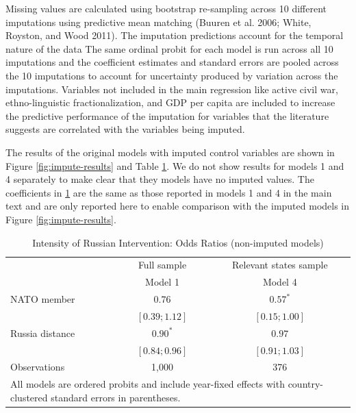 \documentclass[
]{article}
\begin{document}
Missing values are calculated using bootstrap re-sampling across 10 different imputations using predictive mean matching (Buuren et al. 2006; White, Royston, and Wood 2011). The imputation predictions account for the temporal nature of the data The same ordinal probit for each model is run across all 10 imputations and the coefficient estimates and standard errors are pooled across the 10 imputations to account for uncertainty produced by variation across the imputations. Variables not included in the main regression like active civil war, ethno-linguistic fractionalization, and GDP per capita are included to increase the predictive performance of the imputation for variables that the literature suggests are correlated with the variables being imputed.

The results of the original models with imputed control variables are shown in Figure \ref{fig:impute-results} and Table \ref{tab:nonimpute-results}. We do not show results for models 1 and 4 separately to make clear that they models have no imputed values. The coefficients in \ref{tab:nonimpute-results} are the same as those reported in models 1 and 4 in the main text and are only reported here to enable comparison with the imputed models in Figure \ref{fig:impute-results}.

\begin{table}[h!]
\begin{center}
\begin{tabular}{l c c}
\hline
 & \multicolumn{1}{c}{Full sample} & \multicolumn{1}{c}{Relevant states sample} \\
\cline{2-2} \cline{3-3}
 & Model 1 & Model 4 \\
\hline
NATO member     & $0.76$          & $0.57^{*}$      \\
                & $ [0.39; 1.12]$ & $ [0.15; 1.00]$ \\
Russia distance & $0.90^{*}$      & $0.97$          \\
                & $ [0.84; 0.96]$ & $ [0.91; 1.03]$ \\
\hline
Observations    & 1,000           & 376             \\
\hline
\multicolumn{3}{l}{\scriptsize{All models are ordered probits and include year-fixed effects with country-clustered standard errors in parentheses.}}
\end{tabular}
\caption{Intensity of Russian Intervention: Odds Ratios (non-imputed models)}
\label{tab:nonimpute-results}
\end{center}
\end{table}
\end{document}
